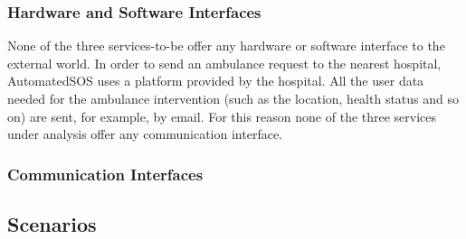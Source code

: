 \subsubsection{Hardware and Software Interfaces}
None of the three services-to-be offer any hardware or software interface to the external world. In order to send an ambulance request to the nearest hospital, AutomatedSOS uses a platform provided by the hospital. All the user data needed for the ambulance intervention (such as the location, health status and so on) are sent, for example, by email. For this reason none of the three services under analysis offer any communication interface.
\subsubsection{Communication Interfaces}
\subsection{Scenarios}
